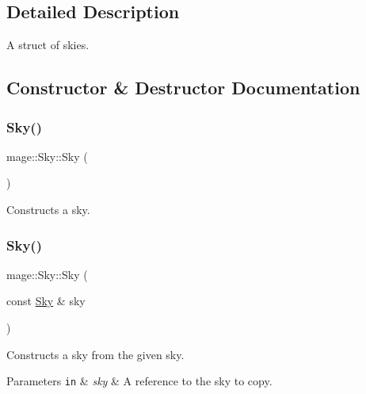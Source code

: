 \subsection{Detailed Description}
A struct of skies. 

\subsection{Constructor \& Destructor Documentation}
\hypertarget{structmage_1_1_sky_a4e54074f11814aee89e2554f35e551aa}{}\label{structmage_1_1_sky_a4e54074f11814aee89e2554f35e551aa} 
\subsubsection{\texorpdfstring{Sky()}{Sky()}\hspace{0.1cm}{\footnotesize\ttfamily [1/3]}}
{\footnotesize\ttfamily mage\+::\+Sky\+::\+Sky (\begin{DoxyParamCaption}{ }\end{DoxyParamCaption})\hspace{0.3cm}{\ttfamily [default]}}

Constructs a sky. \hypertarget{structmage_1_1_sky_ab041650afed6344cd7874308def5c35c}{}\label{structmage_1_1_sky_ab041650afed6344cd7874308def5c35c} 
\subsubsection{\texorpdfstring{Sky()}{Sky()}\hspace{0.1cm}{\footnotesize\ttfamily [2/3]}}
{\footnotesize\ttfamily mage\+::\+Sky\+::\+Sky (\begin{DoxyParamCaption}\item[{const \hyperlink{structmage_1_1_sky}{Sky} \&}]{sky }\end{DoxyParamCaption})\hspace{0.3cm}{\ttfamily [default]}}

Constructs a sky from the given sky.


\begin{DoxyParams}[1]{Parameters}
\mbox{\tt in}  & {\em sky} & A reference to the sky to copy. \\
\hline
\end{DoxyParams}
\hypertarget{structmage_1_1_sky_acf43250f4e0af2e3ab262c6c36b19a9a}{}\label{structmage_1_1_sky_acf43250f4e0af2e3ab262c6c36b19a9a} 
